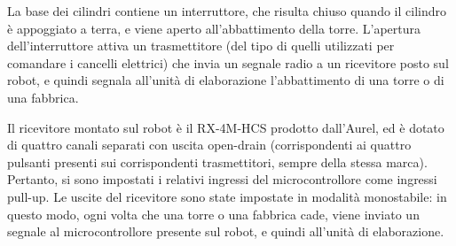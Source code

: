 La base dei cilindri contiene un interruttore, che risulta chiuso quando il cilindro è appoggiato a terra, e viene aperto all'abbattimento della torre. L'apertura dell'interruttore attiva un trasmettitore (del tipo di quelli utilizzati per comandare i cancelli elettrici) che invia un segnale radio a un ricevitore posto sul robot, e quindi segnala all'unità di elaborazione l'abbattimento di una torre o di una fabbrica.

Il ricevitore montato sul robot è il RX-4M-HCS prodotto dall'Aurel\cite{aurel}, ed è dotato di quattro canali separati con uscita open-drain (corrispondenti ai quattro pulsanti presenti sui corrispondenti trasmettitori, sempre della stessa marca). Pertanto, si sono impostati i relativi ingressi del microcontrollore come ingressi pull-up. Le uscite del ricevitore sono state impostate in modalità monostabile: in questo modo, ogni volta che una torre o una fabbrica cade, viene inviato un segnale al microcontrollore presente sul robot, e quindi all'unità di elaborazione.
